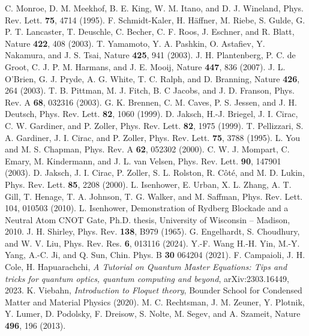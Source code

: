 \documentclass[reprint, amsmath, amssymb, aps]{revtex4-2}
\begin{document}
\begin{thebibliography}{9}
C. Monroe, D. M. Meekhof, B. E. King, W. M. Itano, and D. J. Wineland,
Phys. Rev. Lett. \textbf{75}, 4714 (1995).
F. Schmidt-Kaler, H. Häffner, M. Riebe, S. Gulde, G. P. T. Lancaster, T. Deuschle, C. Becher, C. F. Roos, J. Eschner, and R. Blatt, Nature \textbf{422}, 408 (2003).
T. Yamamoto, Y. A. Pashkin, O. Astafiev, Y. Nakamura, and J. S. Tsai, Nature \textbf{425}, 941 (2003).
J. H. Plantenberg, P. C. de Groot, C. J. P. M. Harmans, and J. E. Mooij, Nature \textbf{447}, 836 (2007).
J. L. O'Brien, G. J. Pryde, A. G. White, T. C. Ralph, and D. Branning, 
Nature \textbf{426}, 264 (2003).
T. B. Pittman, M. J. Fitch, B. C Jacobs, and J. D. Franson, Phys. Rev. A \textbf{68}, 032316 (2003).
G. K. Brennen, C. M. Caves, P. S. Jessen, and J. H. Deutsch, Phys. Rev. Lett. \textbf{82}, 1060 (1999).
D. Jaksch, H.-J. Briegel, J. I. Cirac, C. W. Gardiner, and P. Zoller, Phys. Rev. Lett. \textbf{82}, 1975 (1999).
T. Pellizzari, S. A. Gardiner, J. I. Cirac, and P. Zoller, Phys. Rev. Lett. \textbf{75}, 3788 (1995).
L. You and M. S. Chapman, Phys. Rev. A \textbf{62}, 052302 (2000).
C. W. J. Mompart, C. Emary, M. Kindermann, and J. L. van Velsen, Phys. Rev. Lett. \textbf{90}, 147901 (2003).
D. Jaksch, J. I. Cirac, P. Zoller, S. L. Rolston, R. Côté, and M. D. Lukin, Phys. Rev. Lett. \textbf{85}, 2208 (2000).
L. Isenhower, E. Urban, X. L. Zhang, A. T. Gill, T. Henage, T. A. Johnson, T. G. Walker, and M. Saffman, Phys. Rev. Lett. 104, 010503 (2010).
L. Isenhower, Demonstration of Rydberg Blockade and a Neutral Atom CNOT Gate, Ph.D. thesis, University of Wisconsin – Madison, 2010.
J. H. Shirley, Phys. Rev. \textbf{138}, B979 (1965). 
G. Engelhardt, S. Choudhury, and W. V. Liu, Phys. Rev. Res. \textbf{6}, 013116 (2024). 
Y.-F. Wang H.-H. Yin, M.-Y. Yang, A.-C. Ji, and Q. Sun, Chin. Phys. B \textbf{30} 064204 (2021).
F. Campaioli, J. H. Cole, H. Hapuarachchi, \textit{A Tutorial on Quantum Master Equations: Tips and tricks for quantum optics, quantum computing and beyond}, arXiv:2303.16449, 2023. 
K. Viebahn, \textit{Introduction to Floquet theory}, Bounder School for Condensed Matter and Material Physics (2020).
M. C. Rechtsman, J. M. Zeuner, Y. Plotnik, Y. Lumer, D. Podolsky, F. Dreisow, S. Nolte, M. Segev, and A. Szameit, Nature \textbf{496}, 196 (2013).

\end{thebibliography}
\end{document}
